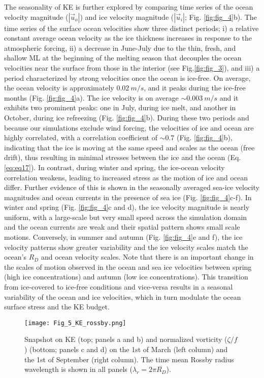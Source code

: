 \documentclass[draft]{agujournal2019}
\begin{document}
The seasonality of KE is further explored by comparing time series of the ocean velocity magnitude ($|\vec{u}_o|$) and ice velocity magnitude ($|\vec{u}_i|$; Fig. \ref{fig:fig_4}b). The time series of the surface ocean velocities show three distinct periods; i) a relative constant average ocean velocity as the ice thickness increases in response to the atmospheric forcing, ii) a decrease in June-July due to the thin, fresh, and shallow ML at the beginning of the melting season that decouples the ocean velocities near the surface from those in the interior (see Fig.\ref{fig:fig_3}), and iii) a period characterized by strong velocities once the ocean is ice-free.
On average, the ocean velocity is approximately $0.02\ m/s$, and it peaks during the ice-free months (Fig. \ref{fig:fig_4}a). The ice velocity is on average $\sim 0.003\ m/s$ and it exhibits two prominent peaks: one in July, during ice melt, and another in October, during ice refreezing (Fig. \ref{fig:fig_4}b). During these two periods and because our simulations exclude wind forcing, the velocities of ice and ocean are highly correlated, with a correlation coefficient of $\sim 0.7$ (Fig. \ref{fig:fig_4}b), indicating that the ice is moving at the same speed and scales as the ocean (free drift), thus resulting in minimal stresses between the ice and the ocean (Eq. \ref{eq:eq17}). In contrast, during winter and spring, the ice-ocean velocity correlation weakens, leading to increased stress as the motion of ice and ocean differ. Further evidence of this is shown in the seasonally averaged sea-ice velocity magnitudes and ocean currents in the presence of sea ice (Fig. \ref{fig:fig_4}c-f). In winter and spring (Fig. \ref{fig:fig_4}c and d), the ice velocity magnitude is nearly uniform, with a large-scale but very small speed across the simulation domain and the ocean currents are weak and their spatial pattern shows small scale motions. Conversely, in summer and autumn (Fig. \ref{fig:fig_4}e and f), the ice velocity patterns show greater variability and the ice velocity scales match the ocean's $R_D$ and ocean velocity scales. Note that there is an important change in the scales of motion observed in the ocean and sea ice velocities between spring (high ice concentrations) and autumn (low ice concentrations). This transition from ice-covered to ice-free conditions and vice-versa results in a seasonal variability of the ocean and ice velocities, which in turn modulate the ocean surface stress and the KE budget.

\begin{figure}[t!]
  \texttt{[image: Fig\_5\_KE\_rossby.png]}
  \caption{Snapshot on KE (top; panels a and  b) and normalized vorticity ($\zeta/f$) (bottom; panels c and d) on the 1st of March (left column) and the 1st of September (right column). The time mean Rossby radius wavelength is shown in all panels ($\lambda_r = 2\pi \overline{R_D}$).}
  \label{fig:fig_5}
\end{figure}
\end{document}
